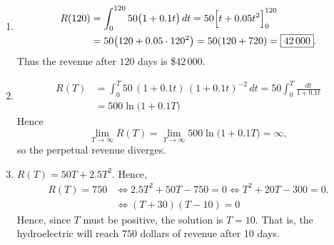 \documentclass[11pt]{exam}
\begin{document}
\begin{questions}
\begin{solution}
\begin{enumerate}[label=(\alph*)]
\item 
\[
\begin{aligned}
R(120)&=\int_{0}^{120} 50\bigl(1+0.1t\bigr)\,dt
      =50\Bigl[t+0.05t^{2}\Bigr]_{0}^{120}   \\
      &=50\bigl(120+0.05\cdot 120^{2}\bigr)
      =50(120+720)=\boxed{42\,000}.
\end{aligned}
\]
Thus the revenue after \(120\) days is \$42\,000.

\item 
\begin{align*}
    R(T) &=\int_{0}^{T} 50\,(1+0.1t)\,(1+0.1t)^{-2}\,dt
          =50\int_{0}^{T}\frac{dt}{1+0.1t} \\
        &= 500\ln\!\bigl(1+0.1T\bigr)
\end{align*}
Hence
\[
\lim_{T\to\infty}R(T)=\lim_{T\to\infty}500\ln\!\bigl(1+0.1T\bigr)=\infty,
\]
so the perpetual revenue diverges.

\item $R(T)=50T+2.5T^{2}$. Hence,
\begin{align*}
    R(T)=750 &\Longleftrightarrow 2.5T^{2}+50T-750=0
    \Longleftrightarrow T^{2}+20T-300=0. \\
    &\Longleftrightarrow (T+30)(T-10) = 0
\end{align*}
Hence, since $T$ must be positive, the solution is $T = 10$. That is, the hydroelectric will reach $750$ dollars of revenue after 10 days.
\end{enumerate}
\end{solution}

\end{questions}
\end{document}
